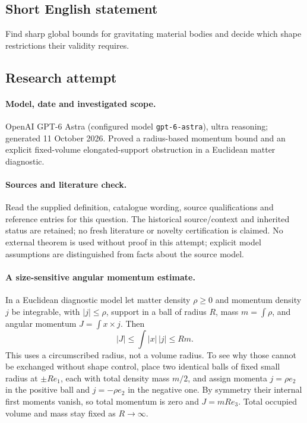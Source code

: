 \documentclass[11pt]{article}
\begin{document}
\subsection{Short English statement}
Find sharp global bounds for gravitating material bodies and decide which shape restrictions their validity requires.
\subsection{Research attempt}
\paragraph{Model, date and investigated scope.}
OpenAI GPT-6 Astra (configured model \texttt{gpt-6-astra}), ultra reasoning; generated 11 October 2026. Proved a radius-based momentum bound and an explicit fixed-volume elongated-support obstruction in a Euclidean matter diagnostic.

\paragraph{Sources and literature check.}
Read the supplied definition, catalogue wording, source qualifications and reference entries for this question. The historical source/context and inherited status are retained; no fresh literature or novelty certification is claimed. No external theorem is used without proof in this attempt; explicit model assumptions are distinguished from facts about the source model.

\paragraph{A size-sensitive angular momentum estimate.} In a Euclidean diagnostic model let matter density \(\rho\ge0\) and momentum density \(j\) be integrable, with \(|j|\le\rho\), support in a ball of radius \(R\), mass \(m=\int\rho\), and angular momentum \(J=\int x\times j\). Then
\[
 |J|\le\int|x|\,|j|\le Rm.
\]
This uses a circumscribed radius, not a volume radius. To see why those cannot be exchanged without shape control, place two identical balls of fixed small radius at \(\pm Re_1\), each with total density mass \(m/2\), and assign momenta \(j=\rho e_2\) in the positive ball and \(j=-\rho e_2\) in the negative one. By symmetry their internal first moments vanish, so total momentum is zero and \(J=mR e_3\). Total occupied volume and mass stay fixed as \(R\to\infty\).
\end{document}

